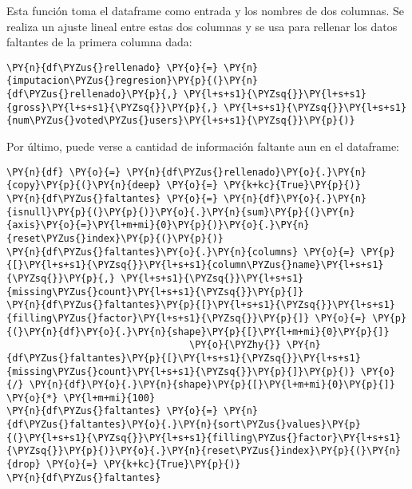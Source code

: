     Esta función toma el dataframe como entrada y los nombres de dos
columnas. Se realiza un ajuste lineal entre estas dos columnas y se usa
para rellenar los datos faltantes de la primera columna dada:

    \begin{tcolorbox}[breakable, size=fbox, boxrule=1pt, pad at break*=1mm,colback=cellbackground, colframe=cellborder]
\begin{Verbatim}[commandchars=\\\{\}]
\PY{n}{df\PYZus{}rellenado} \PY{o}{=} \PY{n}{imputacion\PYZus{}regresion}\PY{p}{(}\PY{n}{df\PYZus{}rellenado}\PY{p}{,} \PY{l+s+s1}{\PYZsq{}}\PY{l+s+s1}{gross}\PY{l+s+s1}{\PYZsq{}}\PY{p}{,} \PY{l+s+s1}{\PYZsq{}}\PY{l+s+s1}{num\PYZus{}voted\PYZus{}users}\PY{l+s+s1}{\PYZsq{}}\PY{p}{)}
\end{Verbatim}
\end{tcolorbox}

    Por último, puede verse a cantidad de información faltante aun en el
dataframe:

    \begin{tcolorbox}[breakable, size=fbox, boxrule=1pt, pad at break*=1mm,colback=cellbackground, colframe=cellborder]
\begin{Verbatim}[commandchars=\\\{\}]
\PY{n}{df} \PY{o}{=} \PY{n}{df\PYZus{}rellenado}\PY{o}{.}\PY{n}{copy}\PY{p}{(}\PY{n}{deep} \PY{o}{=} \PY{k+kc}{True}\PY{p}{)}
\PY{n}{df\PYZus{}faltantes} \PY{o}{=} \PY{n}{df}\PY{o}{.}\PY{n}{isnull}\PY{p}{(}\PY{p}{)}\PY{o}{.}\PY{n}{sum}\PY{p}{(}\PY{n}{axis}\PY{o}{=}\PY{l+m+mi}{0}\PY{p}{)}\PY{o}{.}\PY{n}{reset\PYZus{}index}\PY{p}{(}\PY{p}{)}
\PY{n}{df\PYZus{}faltantes}\PY{o}{.}\PY{n}{columns} \PY{o}{=} \PY{p}{[}\PY{l+s+s1}{\PYZsq{}}\PY{l+s+s1}{column\PYZus{}name}\PY{l+s+s1}{\PYZsq{}}\PY{p}{,} \PY{l+s+s1}{\PYZsq{}}\PY{l+s+s1}{missing\PYZus{}count}\PY{l+s+s1}{\PYZsq{}}\PY{p}{]}
\PY{n}{df\PYZus{}faltantes}\PY{p}{[}\PY{l+s+s1}{\PYZsq{}}\PY{l+s+s1}{filling\PYZus{}factor}\PY{l+s+s1}{\PYZsq{}}\PY{p}{]} \PY{o}{=} \PY{p}{(}\PY{n}{df}\PY{o}{.}\PY{n}{shape}\PY{p}{[}\PY{l+m+mi}{0}\PY{p}{]} 
                                \PY{o}{\PYZhy{}} \PY{n}{df\PYZus{}faltantes}\PY{p}{[}\PY{l+s+s1}{\PYZsq{}}\PY{l+s+s1}{missing\PYZus{}count}\PY{l+s+s1}{\PYZsq{}}\PY{p}{]}\PY{p}{)} \PY{o}{/} \PY{n}{df}\PY{o}{.}\PY{n}{shape}\PY{p}{[}\PY{l+m+mi}{0}\PY{p}{]} \PY{o}{*} \PY{l+m+mi}{100}
\PY{n}{df\PYZus{}faltantes} \PY{o}{=} \PY{n}{df\PYZus{}faltantes}\PY{o}{.}\PY{n}{sort\PYZus{}values}\PY{p}{(}\PY{l+s+s1}{\PYZsq{}}\PY{l+s+s1}{filling\PYZus{}factor}\PY{l+s+s1}{\PYZsq{}}\PY{p}{)}\PY{o}{.}\PY{n}{reset\PYZus{}index}\PY{p}{(}\PY{n}{drop} \PY{o}{=} \PY{k+kc}{True}\PY{p}{)}
\PY{n}{df\PYZus{}faltantes}
\end{Verbatim}
\end{tcolorbox}

